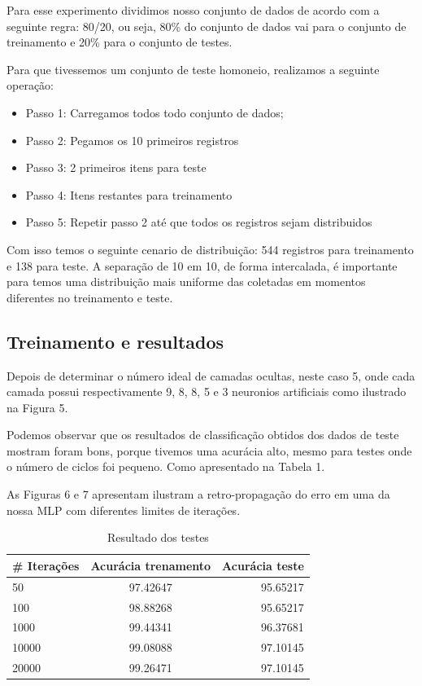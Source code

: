 \documentclass[conference]{IEEEtran}
\begin{document}
    Para esse experimento dividimos nosso conjunto de dados de acordo com a seguinte regra: 80/20, ou seja, 80\% do conjunto de dados vai para o conjunto de treinamento e 20\% para o conjunto de testes. 
    
    Para que tivessemos um conjunto de teste homoneio, realizamos a seguinte operação:
    
    \begin{itemize}
    
    \item Passo 1: Carregamos todos todo conjunto de dados;
    \item Passo 2: Pegamos os 10 primeiros registros
    \item Passo 3: 2 primeiros itens para teste
    \item Passo 4: Itens restantes para treinamento
    \item Passo 5: Repetir passo 2 até que todos os registros sejam distribuidos
    
    \end{itemize}
    
    Com isso temos o seguinte cenario de distribuição: 544 registros para treinamento e 138 para teste. A separação de 10 em 10, de forma intercalada, é importante para temos uma distribuição mais uniforme das coletadas em momentos diferentes no treinamento e teste.
    

    \subsection{Treinamento e resultados}
    
    Depois de determinar o número ideal de camadas ocultas, neste caso 5, onde cada camada possui respectivamente 9, 8, 8, 5 e 3 neuronios artificiais como ilustrado na Figura 5.
     
    Podemos observar que os resultados de classificação obtidos dos dados de teste mostram foram bons, porque tivemos uma acurácia alto, mesmo para testes onde o número de ciclos foi pequeno. Como apresentado na Tabela 1.
    
    As Figuras 6 e 7 apresentam ilustram a retro-propagação do erro em uma da nossa MLP com diferentes limites de iterações.
    \begin{table}[]
	\caption{Resultado dos testes}
	\begin{center}
    \begin{tabular}{l | c | r }
    \hline
         \# Iterações &Acurácia trenamento  & Acurácia teste \\\hline
         50 &97.42647  &95.65217    \\\hline
         100 &98.88268  &95.65217    \\\hline
         1000 &99.44341  &96.37681    \\\hline
         10000 &99.08088  &97.10145   \\\hline
         20000 &99.26471  &97.10145  \\\hline
    \end{tabular}
    \end{center}
    \end{table}
    
\end{document}
